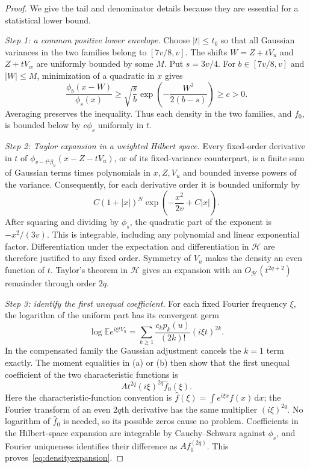 \documentclass[11pt,a4paper]{article}
\numberwithin{equation}{section}
\theoremstyle{definition}
\theoremstyle{remark}
\newcommand{\E}{\mathbb E}
\newcommand{\dd}{\,\mathrm d}
\begin{document}
\begin{proof}
We give the tail and denominator details because they are essential for a
statistical lower bound.

\emph{Step 1: a common positive lower envelope.}
Choose $|t|\le t_0$ so that all Gaussian variances in the two families belong
to $[7v/8,v]$. The shifts $W=Z+tV_u$ and $Z+tV_w$ are uniformly bounded by
some $M$. Put $s=3v/4$. For $b\in[7v/8,v]$ and $|W|\le M$, minimization of
a quadratic in $x$ gives
\begin{equation}
 \frac{\phi_b(x-W)}{\phi_s(x)}
 \ge\sqrt{\frac{s}{b}}\exp\left(-\frac{W^2}{2(b-s)}\right)\ge c>0.
 \label{eq:envelope}
\end{equation}
Averaging preserves the inequality. Thus each density in the two families,
and $f_0$, is bounded below by $c\phi_s$ uniformly in $t$.

\emph{Step 2: Taylor expansion in a weighted Hilbert space.}
Every fixed-order derivative in $t$ of
$\phi_{v-t^2\beta_u}(x-Z-tV_u)$, or of its fixed-variance counterpart, is a
finite sum of Gaussian terms times polynomials in $x,Z,V_u$ and bounded
inverse powers of the variance. Consequently, for each derivative order it
is bounded uniformly by
\begin{equation}
 C(1+|x|)^N\exp\left(-\frac{x^2}{2v}+C|x|\right).
 \label{eq:derivativebound}
\end{equation}
After squaring and dividing by $\phi_s$, the quadratic part of the exponent
is $-x^2/(3v)$. This is integrable, including any polynomial and linear
exponential factor. Differentiation under the expectation and differentiation
in $\mathcal H$ are therefore justified to any fixed order. Symmetry of
$V_u$ makes the density an even function of $t$. Taylor's theorem in
$\mathcal H$ gives an expansion with an $O_{\mathcal H}(t^{2q+2})$ remainder
through order $2q$.

\emph{Step 3: identify the first unequal coefficient.}
For each fixed Fourier frequency $\xi$, the logarithm of the uniform part
has its convergent germ
\[
 \log\E e^{i\xi tV_u}
   =\sum_{k\ge1}\frac{c_kp_k(u)}{(2k)!}(i\xi t)^{2k}.
\]
In the compensated family the Gaussian adjustment cancels the $k=1$ term
exactly. The moment equalities in (a) or (b) then show that the first unequal
coefficient of the two characteristic functions is
\[
 A t^{2q}(i\xi)^{2q}\widehat f_0(\xi).
\]
Here the characteristic-function convention is
$\widehat f(\xi)=\int e^{i\xi x}f(x)\dd x$; the Fourier transform of an even
$2q$th derivative has the same multiplier $(i\xi)^{2q}$.
No logarithm of $\widehat f_0$ is needed, so its possible zeros cause no
problem. Coefficients in the Hilbert-space expansion are integrable by
Cauchy--Schwarz against $\phi_s$, and Fourier uniqueness identifies their
difference as $A f_0^{(2q)}$. This proves~\eqref{eq:densityexpansion}.


\end{proof}
\end{document}
